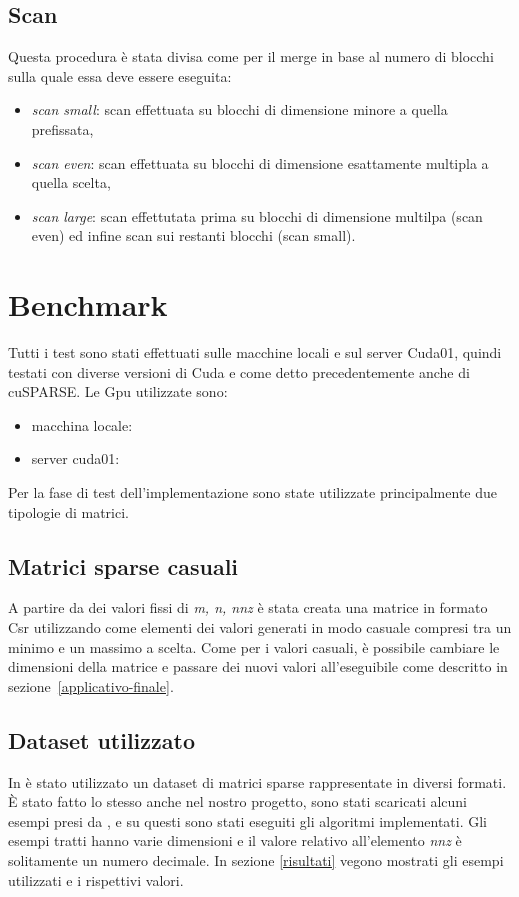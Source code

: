 \documentclass[]{IEEEtran}
\begin{document}
	\subsection{Scan}
	\label{scan}
	Questa procedura è stata divisa come per il merge in base al numero di blocchi sulla quale essa deve essere eseguita:
	\begin{itemize}
		\item \textit{scan small}: scan effettuata su blocchi di dimensione minore a quella prefissata,
		\item \textit{scan even}: scan effettuata su blocchi di dimensione esattamente multipla a quella scelta,
		\item \textit{scan large}: scan effettutata prima su blocchi di dimensione multilpa (scan even) ed infine scan sui restanti blocchi (scan small).
	\end{itemize}
	

\section{Benchmark}
\label{benchmark}
	Tutti i test sono stati effettuati sulle macchine locali e sul server Cuda01, quindi testati con diverse versioni di Cuda e come detto precedentemente anche di cuSPARSE. Le Gpu utilizzate sono:
	\begin{itemize}
		\item macchina locale:	%
		\item server cuda01:
	\end{itemize}
	Per la fase di test dell'implementazione sono state utilizzate principalmente due tipologie di matrici.
	
	\subsection{Matrici sparse casuali}
	A partire da dei valori fissi di \textit{m, n, nnz} è stata creata una matrice in formato Csr utilizzando come elementi dei valori generati in modo casuale compresi tra un minimo e un massimo a scelta. Come per i valori casuali, è possibile cambiare le dimensioni della matrice e passare dei nuovi valori all'eseguibile come descritto in sezione~\ref{applicativo-finale}.
	
	\subsection{Dataset utilizzato}
	In \cite{parallelTrans} è stato utilizzato un dataset di matrici sparse rappresentate in diversi formati. È stato fatto lo stesso anche nel nostro progetto, sono stati scaricati alcuni esempi presi da \cite{dataset}, e su questi sono stati eseguiti gli algoritmi implementati. Gli esempi tratti hanno varie dimensioni e il valore relativo all'elemento \textit{nnz} è solitamente un numero decimale. In sezione \ref{risultati} vegono mostrati gli esempi utilizzati e i rispettivi valori.
	
\end{document}
